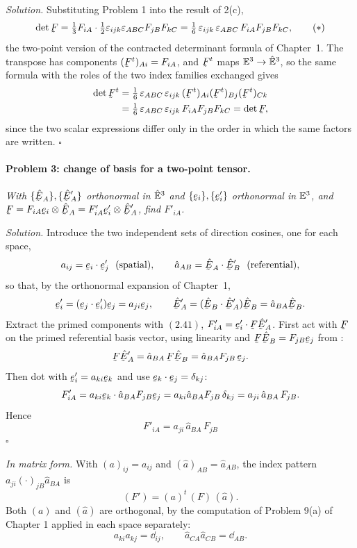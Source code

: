 \emph{Solution.} Substituting Problem 1 into the result of 2(c),
\begin{equation}
   \det\bF=\tfrac13F_{iA}\cdot\tfrac12\eps_{ijk}\eps_{ABC}F_{jB}F_{kC}
   =\tfrac16\,\eps_{ijk}\,\eps_{ABC}\,F_{iA}F_{jB}F_{kC},
   \tag{$\ast$}
\end{equation}
the two-point version of the contracted determinant formula of Chapter~1.
The transpose has components $(\bF^{t})_{Ai}=F_{iA}$, and $\bF^{t}$ maps
$\mathbb{E}^{3}\to\hat{\mathbb{E}}^{3}$, so the same formula with the roles of the two index families
exchanged gives
\[
\begin{aligned}
   \det\bF^{t}&=\tfrac16\,\eps_{ABC}\,\eps_{ijk}\,
      (\bF^{t})_{Ai}(\bF^{t})_{Bj}(\bF^{t})_{Ck}\\
   &=\tfrac16\,\eps_{ABC}\,\eps_{ijk}\,F_{iA}F_{jB}F_{kC}=\det\bF,
\end{aligned}
\]
since the two scalar expressions differ only in the order in which the same
factors are written. \hfill$\square$

%
\paragraph*{Problem 3: change of basis for a two-point tensor.}
\emph{With $\{\hbE_A\},\{\hbE'_A\}$ orthonormal in $\hat{\mathbb{E}}^{3}$ and
$\{\be_i\},\{\be'_i\}$ orthonormal in $\mathbb{E}^{3}$, and
$\bF=F_{iA}\be_i\otimes\hbE_A=F'_{iA}\be'_i\otimes\hbE'_A$, find $F'_{iA}$.}

\emph{Solution.} Introduce the two independent sets of direction cosines,
one for each space,
\[
   a_{ij}=\ip{\be_i}{\be'_j}\ \ (\text{spatial}),\qquad
   \hat a_{AB}=\ip{\hbE_A}{\hbE'_B}\ \ (\text{referential}),
\]
so that, by the orthonormal expansion of Chapter~1,
\[
   \be'_i=(\ip{\be_j}{\be'_i})\be_j=a_{ji}\be_j,\qquad
   \hbE'_A=(\ip{\hbE_B}{\hbE'_A})\hbE_B=\hat a_{BA}\hbE_B .
\]
Extract the primed components with $(2.41)$, $F'_{iA}=\ip{\be'_i}{\bF\hbE'_A}$.
First act with $\bF$ on the primed referential basis vector, using linearity
and $\bF\hbE_B=F_{jB}\be_j$ from :
\[
   \bF\hbE'_A=\hat a_{BA}\,\bF\hbE_B=\hat a_{BA}F_{jB}\,\be_j .
\]
Then dot with $\be'_i=a_{ki}\be_k$ and use $\ip{\be_k}{\be_j}=\dd_{kj}$:
\[
   F'_{iA}=\ip{a_{ki}\be_k}{\hat a_{BA}F_{jB}\be_j}
   =a_{ki}\hat a_{BA}F_{jB}\,\dd_{kj}
   =a_{ji}\,\hat a_{BA}\,F_{jB}.
\]
Hence
\[
   \boxed{\;F'_{iA}=a_{ji}\,\hat a_{BA}\,F_{jB}\;}
\]
\hfill$\square$

\emph{In matrix form.} With $(a)_{ij}=a_{ij}$ and
$(\hat a)_{AB}=\hat a_{AB}$, the index pattern $a_{ji}(\cdot)_{jB}
\hat a_{BA}$ is
\[
   (F')=(a)^{t}\,(F)\,(\hat a).
\]
Both $(a)$ and $(\hat a)$ are orthogonal, by the computation of Problem
9(a) of Chapter 1 applied in each space separately:
\[
   a_{ki}a_{kj}=\dd_{ij},\qquad \hat a_{CA}\hat a_{CB}=\dd_{AB}.
\]

